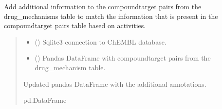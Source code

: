 \documentclass[letterpaper,10pt,english]{sphinxmanual}
\begin{document}
\begin{fulllineitems}
\label{\detokenize{get_drug_mechanism_ct_pairs:get_drug_mechanism_ct_pairs.add_annotations_to_drug_mechanisms_cti}}
\pysigstartsignatures
{}
\pysigstopsignatures
\sphinxAtStartPar
Add additional information to the compound\sphinxhyphen{}target pairs from the drug\_mechanisms table
to match the information that is present in the compound\sphinxhyphen{}target pairs table based on activities.
\begin{quote}\begin{description}
\begin{itemize}
\item {} 
\sphinxAtStartPar
{} () \textendash{} Sqlite3 connection to ChEMBL database.

\item {} 
\sphinxAtStartPar
{} () \textendash{} Pandas DataFrame with compound\sphinxhyphen{}target pairs from the drug\_mechanism table.

\end{itemize}

\sphinxAtStartPar
Updated pandas DataFrame with the additional annotations.

\sphinxAtStartPar
pd.DataFrame

\end{description}\end{quote}

\end{fulllineitems}

\end{document}
